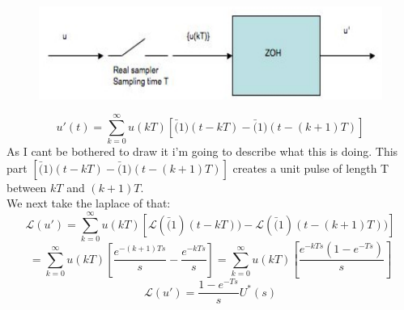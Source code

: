 \documentclass[a4paper,11pt]{article}
\begin{document}
		\begin{figure}[htp]
		\centering
		\includegraphics[scale=0.4]{images/sample_and_hold}
		\end{figure}
		\begin{equation}
			u'(t)=\sum\limits_{k=0}^{\infty}u(kT)[\bar(1)(t-kT)-\bar(1)(t-(k+1)T)]		
		\end{equation}
		As I cant be bothered to draw it i'm going to describe what this is doing. This part $[\bar(1)(t-kT)-\bar(1)(t-(k+1)T)]$ creates a unit pulse of length T between $kT$ and $(k+1)T$.\\
		We next take the laplace of that: 
		\begin{equation}
			\mathcal{L}(u')=\sum\limits_{k=0}^{\infty}u(kT)[\mathcal{L}(\bar(1)(t-kT))-\mathcal{L}(\bar(1)(t-(k+1)T))]
		\end{equation}	
		\begin{equation}
			=\sum\limits_{k=0}^{\infty}u(kT)[\frac{e^{-(k+1)Ts}}{s}-\frac{e^{-kTs}}{s}]=\sum\limits_{k=0}^{\infty}u(kT)[\frac{e^{-kTs}(1-e^{-Ts})}{s}]
		\end{equation}
		\begin{equation}
			\mathcal{L}(u')=\frac{1-e^{-Ts}}{s}U^*(s)
		\end{equation}	
\end{document}
